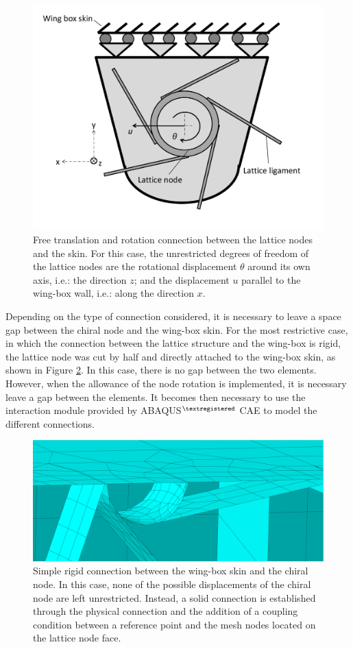     \begin{figure}[!htpb]
      \centering
      \includegraphics[width=0.6 \textwidth]{figures/model/connectionModeling2}
      \caption[Free translation and rotation connection between the lattice nodes and the skin]{Free translation and rotation connection between the lattice nodes and the skin. For this case, the unrestricted degrees of freedom of the lattice nodes are the rotational displacement $\theta$ around its own axis, i.e.: the direction $z$; and the displacement $u$ parallel to the wing-box wall, i.e.: along the direction $x$.}\label{fig:connectionModeling2}
    \end{figure}

    Depending on the type of connection considered, it is necessary to leave a space gap between the chiral node and the wing-box skin. For the most restrictive case, in which the connection between the lattice structure and the wing-box is rigid, the lattice node was cut by half and directly attached to the wing-box skin, as shown in Figure \ref{fig:chiralNodeCut}. In this case, there is no gap between the two elements. However, when the allowance of the node rotation is implemented, it is necessary leave a gap between the elements. It becomes then necessary to use the interaction module provided by ABAQUS$^{\textregistered}$ CAE to model the different connections. %

    \begin{figure}[!htpb]
      \centering
      \includegraphics[width=0.8 \textwidth]{figures/model/chiralNodeCut}
      \caption[Simple rigid connection between the wing-box skin and the chiral node]{Simple rigid connection between the wing-box skin and the chiral node. In this case, none of the possible displacements of the chiral node are left unrestricted. Instead, a solid connection is established through the physical connection and the addition of a coupling condition between a reference point and the mesh nodes located on the lattice node face.}
      \label{fig:chiralNodeCut}
    \end{figure} 

